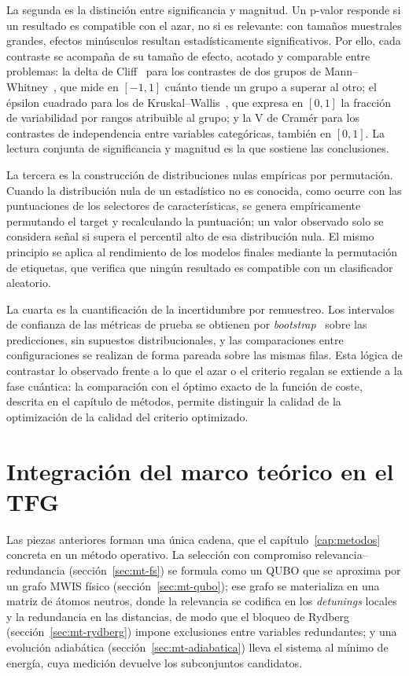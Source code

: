 La segunda es la distinción entre significancia y magnitud. Un
p-valor responde si un resultado es compatible con el azar, no si es
relevante: con tamaños muestrales grandes, efectos minúsculos resultan
estadísticamente significativos. Por ello, cada contraste se acompaña de su tamaño de efecto, acotado y
comparable entre problemas: la delta de Cliff~\cite{cliff1993} para los
contrastes de dos grupos de Mann--Whitney~\cite{mann1947}, que mide en
$[-1,1]$ cuánto tiende un grupo a superar al otro; el épsilon cuadrado
para los de Kruskal--Wallis~\cite{kruskal1952}, que expresa en $[0,1]$
la fracción de variabilidad por rangos atribuible al grupo; y la V de
Cramér para los contrastes de independencia entre variables
categóricas, también en $[0,1]$. La lectura conjunta de significancia y
magnitud es la que sostiene las conclusiones.

La tercera es la construcción de distribuciones nulas empíricas por
permutación. Cuando la distribución nula de un estadístico no es
conocida, como ocurre con las puntuaciones de los selectores de
características, se genera empíricamente permutando el target y
recalculando la puntuación; un valor observado solo se considera señal
si supera el percentil alto de esa distribución nula. El mismo
principio se aplica al rendimiento de los modelos finales mediante la
permutación de etiquetas, que verifica que ningún resultado es
compatible con un clasificador aleatorio.

La cuarta es la cuantificación de la incertidumbre por remuestreo. Los
intervalos de confianza de las métricas de prueba se obtienen por
\textit{bootstrap}~\cite{efron1979} sobre las predicciones, sin
supuestos distribucionales, y las comparaciones entre configuraciones
se realizan de forma pareada sobre las mismas filas. Esta lógica de
contrastar lo observado frente a lo que el azar o el criterio regalan
se extiende a la fase cuántica: la comparación con el óptimo exacto de
la función de coste, descrita en el capítulo de métodos, permite
distinguir la calidad de la optimización de la calidad del criterio
optimizado.



\section{Integración del marco teórico en el TFG}
\label{sec:mt-integracion}

Las piezas anteriores forman una única cadena, que el
capítulo~\ref{cap:metodos} concreta en un método operativo. La
selección con compromiso relevancia--redundancia
(sección~\ref{sec:mt-fs}) se formula como un QUBO que se aproxima por
un grafo MWIS físico (sección~\ref{sec:mt-qubo}); ese grafo se
materializa en una matriz de átomos neutros, donde la relevancia se
codifica en los \textit{detunings} locales y la redundancia en las
distancias, de modo que el bloqueo de Rydberg
(sección~\ref{sec:mt-rydberg}) impone exclusiones entre variables
redundantes; y una evolución adiabática
(sección~\ref{sec:mt-adiabatica}) lleva el sistema al mínimo de energía,
cuya medición devuelve los subconjuntos candidatos.
